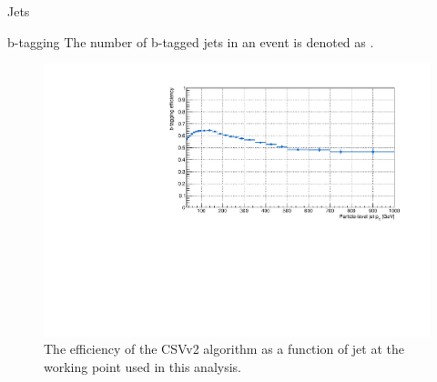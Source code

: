 \begin{section}{Jets}
\begin{subsection}{b-tagging}
The number of b-tagged jets in an event is denoted as \Nb.

\begin{figure}[tbp!]
\centering
\includegraphics[angle=0,width=0.80\columnwidth]{fig/btag_eff.pdf}
\caption{The efficiency of the CSVv2 algorithm as a function of jet \pT at the working point used in this analysis.}
\label{fig:btag_eff}
\end{figure}


\end{subsection}

\end{section}

